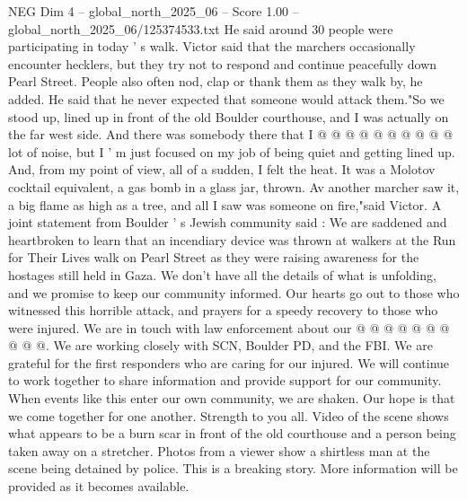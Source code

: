 \begin{textsample}{NEG Dim 4 – global\_north\_2025\_06 – Score 1.00 – global\_north\_2025\_06/125374533.txt}
He said around 30 people were participating in today ' s walk.
Victor said that the marchers occasionally encounter hecklers, but they try not to respond and continue peacefully down Pearl Street.
People also often nod, clap or thank them as they walk by, he added.
He said that he never expected that someone would attack them."So we stood up, lined up in front of the old Boulder courthouse, and I was actually on the far west side.
And there was somebody there that I @ @ @ @ @ @ @ @ @ @ lot of noise, but I ' m just focused on my job of being quiet and getting lined up.
And, from my point of view, all of a sudden, I felt the heat.
It was a Molotov cocktail equivalent, a gas bomb in a glass jar, thrown.
Av another marcher saw it, a big flame as high as a tree, and all I saw was someone on fire,"said Victor.
A joint statement from Boulder ' s Jewish community said : We are saddened and heartbroken to learn that an incendiary device was thrown at walkers at the Run for Their Lives walk on Pearl Street as they were raising awareness for the hostages still held in Gaza.
We don't have all the details of what is unfolding, and we promise to keep our community informed.
Our hearts go out to those who witnessed this horrible attack, and prayers for a speedy recovery to those who were injured.
We are in touch with law enforcement about our @ @ @ @ @ @ @ @ @ @.
We are working closely with SCN, Boulder PD, and the FBI.
We are grateful for the first responders who are caring for our injured.
We will continue to work together to share information and provide support for our community.
When events like this enter our own community, we are shaken.
Our hope is that we come together for one another.
Strength to you all.
Video of the scene shows what appears to be a burn scar in front of the old courthouse and a person being taken away on a stretcher.
Photos from a viewer show a shirtless man at the scene being detained by police.
This is a breaking story.
More information will be provided as it becomes available.

\end{textsample}
